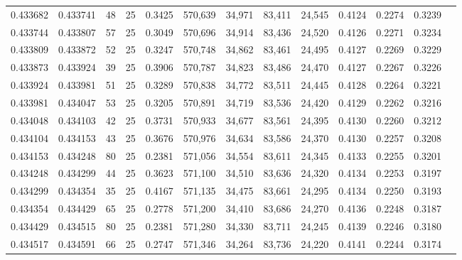 \begin{tabular}{rrrrrrrrrrrrr}
0.433682 & 0.433741 &    48 &  25 &                                     0.3425 & 570,639 &  34,971 &  83,411 &  24,545 & 0.4124 & 0.2274 & 0.3239 \\
0.433744 & 0.433807 &    57 &  25 &                                     0.3049 & 570,696 &  34,914 &  83,436 &  24,520 & 0.4126 & 0.2271 & 0.3234 \\
0.433809 & 0.433872 &    52 &  25 &                                     0.3247 & 570,748 &  34,862 &  83,461 &  24,495 & 0.4127 & 0.2269 & 0.3229 \\
0.433873 & 0.433924 &    39 &  25 &                                     0.3906 & 570,787 &  34,823 &  83,486 &  24,470 & 0.4127 & 0.2267 & 0.3226 \\
0.433924 & 0.433981 &    51 &  25 &                                     0.3289 & 570,838 &  34,772 &  83,511 &  24,445 & 0.4128 & 0.2264 & 0.3221 \\
0.433981 & 0.434047 &    53 &  25 &                                     0.3205 & 570,891 &  34,719 &  83,536 &  24,420 & 0.4129 & 0.2262 & 0.3216 \\
0.434048 & 0.434103 &    42 &  25 &                                     0.3731 & 570,933 &  34,677 &  83,561 &  24,395 & 0.4130 & 0.2260 & 0.3212 \\
0.434104 & 0.434153 &    43 &  25 &                                     0.3676 & 570,976 &  34,634 &  83,586 &  24,370 & 0.4130 & 0.2257 & 0.3208 \\
0.434153 & 0.434248 &    80 &  25 &                                     0.2381 & 571,056 &  34,554 &  83,611 &  24,345 & 0.4133 & 0.2255 & 0.3201 \\
0.434248 & 0.434299 &    44 &  25 &                                     0.3623 & 571,100 &  34,510 &  83,636 &  24,320 & 0.4134 & 0.2253 & 0.3197 \\
0.434299 & 0.434354 &    35 &  25 &                                     0.4167 & 571,135 &  34,475 &  83,661 &  24,295 & 0.4134 & 0.2250 & 0.3193 \\
0.434354 & 0.434429 &    65 &  25 &                                     0.2778 & 571,200 &  34,410 &  83,686 &  24,270 & 0.4136 & 0.2248 & 0.3187 \\
0.434429 & 0.434515 &    80 &  25 &                                     0.2381 & 571,280 &  34,330 &  83,711 &  24,245 & 0.4139 & 0.2246 & 0.3180 \\
0.434517 & 0.434591 &    66 &  25 &                                     0.2747 & 571,346 &  34,264 &  83,736 &  24,220 & 0.4141 & 0.2244 & 0.3174 \\

\end{tabular}
